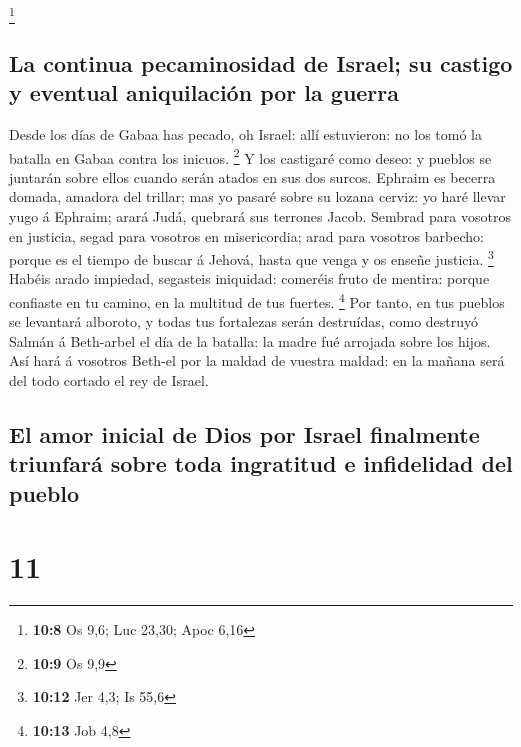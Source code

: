 \footnote{\textbf{10:8} Os 9,6; Luc 23,30; Apoc 6,16}

\hypertarget{la-continua-pecaminosidad-de-israel-su-castigo-y-eventual-aniquilaciuxf3n-por-la-guerra}{%
\subsection{La continua pecaminosidad de Israel; su castigo y eventual
aniquilación por la
guerra}\label{la-continua-pecaminosidad-de-israel-su-castigo-y-eventual-aniquilaciuxf3n-por-la-guerra}}

 Desde los días de Gabaa has pecado, oh Israel: allí
estuvieron: no los tomó la batalla en Gabaa contra los inicuos.
\footnote{\textbf{10:9} Os 9,9}  Y los castigaré como
deseo: y pueblos se juntarán sobre ellos cuando serán atados en sus dos
surcos.  Ephraim es becerra domada, amadora del trillar;
mas yo pasaré sobre su lozana cerviz: yo haré llevar yugo á Ephraim;
arará Judá, quebrará sus terrones Jacob.  Sembrad para
vosotros en justicia, segad para vosotros en misericordia; arad para
vosotros barbecho: porque es el tiempo de buscar á Jehová, hasta que
venga y os enseñe justicia. \footnote{\textbf{10:12} Jer 4,3; Is 55,6}
 Habéis arado impiedad, segasteis iniquidad: comeréis
fruto de mentira: porque confiaste en tu camino, en la multitud de tus
fuertes. \footnote{\textbf{10:13} Job 4,8}  Por tanto, en
tus pueblos se levantará alboroto, y todas tus fortalezas serán
destruídas, como destruyó Salmán á Beth-arbel el día de la batalla: la
madre fué arrojada sobre los hijos.  Así hará á vosotros
Beth-el por la maldad de vuestra maldad: en la mañana será del todo
cortado el rey de Israel.

\hypertarget{el-amor-inicial-de-dios-por-israel-finalmente-triunfaruxe1-sobre-toda-ingratitud-e-infidelidad-del-pueblo}{%
\subsection{El amor inicial de Dios por Israel finalmente triunfará
sobre toda ingratitud e infidelidad del
pueblo}\label{el-amor-inicial-de-dios-por-israel-finalmente-triunfaruxe1-sobre-toda-ingratitud-e-infidelidad-del-pueblo}}

\hypertarget{section-10}{%
\section{11}\label{section-10}}


